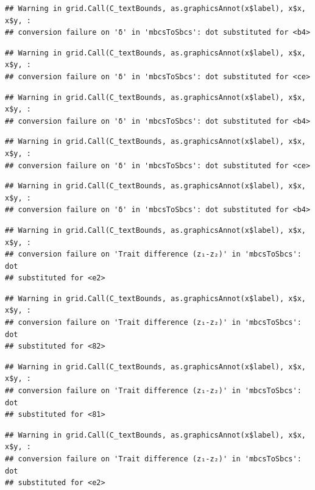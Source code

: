 \documentclass[]{article}
\begin{document}
\begin{verbatim}
## Warning in grid.Call(C_textBounds, as.graphicsAnnot(x$label), x$x, x$y, :
## conversion failure on 'δ' in 'mbcsToSbcs': dot substituted for <b4>
\end{verbatim}

\begin{verbatim}
## Warning in grid.Call(C_textBounds, as.graphicsAnnot(x$label), x$x, x$y, :
## conversion failure on 'δ' in 'mbcsToSbcs': dot substituted for <ce>
\end{verbatim}

\begin{verbatim}
## Warning in grid.Call(C_textBounds, as.graphicsAnnot(x$label), x$x, x$y, :
## conversion failure on 'δ' in 'mbcsToSbcs': dot substituted for <b4>
\end{verbatim}

\begin{verbatim}
## Warning in grid.Call(C_textBounds, as.graphicsAnnot(x$label), x$x, x$y, :
## conversion failure on 'δ' in 'mbcsToSbcs': dot substituted for <ce>
\end{verbatim}

\begin{verbatim}
## Warning in grid.Call(C_textBounds, as.graphicsAnnot(x$label), x$x, x$y, :
## conversion failure on 'δ' in 'mbcsToSbcs': dot substituted for <b4>
\end{verbatim}

\begin{verbatim}
## Warning in grid.Call(C_textBounds, as.graphicsAnnot(x$label), x$x, x$y, :
## conversion failure on 'Trait difference (z₁-z₂)' in 'mbcsToSbcs': dot
## substituted for <e2>
\end{verbatim}

\begin{verbatim}
## Warning in grid.Call(C_textBounds, as.graphicsAnnot(x$label), x$x, x$y, :
## conversion failure on 'Trait difference (z₁-z₂)' in 'mbcsToSbcs': dot
## substituted for <82>
\end{verbatim}

\begin{verbatim}
## Warning in grid.Call(C_textBounds, as.graphicsAnnot(x$label), x$x, x$y, :
## conversion failure on 'Trait difference (z₁-z₂)' in 'mbcsToSbcs': dot
## substituted for <81>
\end{verbatim}

\begin{verbatim}
## Warning in grid.Call(C_textBounds, as.graphicsAnnot(x$label), x$x, x$y, :
## conversion failure on 'Trait difference (z₁-z₂)' in 'mbcsToSbcs': dot
## substituted for <e2>
\end{verbatim}
\end{document}
